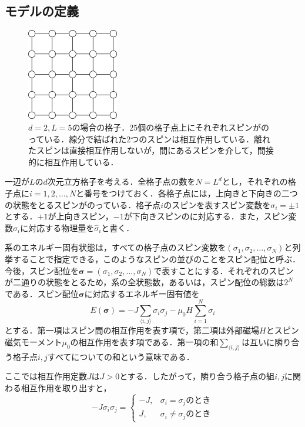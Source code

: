 \documentclass[a4paper,11pt]{jsreport}
\begin{document}
\subsection{モデルの定義}
\begin{figure}[H]
  \begin{center}
      \includegraphics[height=4cm]{image/2次元格子.png}
      \caption{$d=2, L=5$の場合の格子．25個の格子点上にそれぞれスピンがのっている．線分で結ばれた2つのスピンは相互作用している．離れたスピンは直接相互作用しないが，間にあるスピンを介して，間接的に相互作用している．}
  \end{center}
\end{figure}
一辺が$L$の$d$次元立方格子を考える．全格子点の数を$N=L^d$とし，それぞれの格子点に$i=1,2,\dots ,N$と番号をつけておく．各格子点には，上向きと下向きの二つの状態をとるスピンがのっている．格子点$i$のスピンを表すスピン変数を$\sigma_i = \pm{1}$とする．$+1$が上向きスピン，$-1$が下向きスピンのに対応する．また，スピン変数$\sigma_i$に対応する物理量を$\hat{\sigma}_i$と書く．\par
系のエネルギー固有状態は，すべての格子点のスピン変数を$(\sigma_1, \sigma_2, \dots, \sigma_N)$と列挙することで指定できる，このようなスピンの並びのことをスピン配位と呼ぶ．今後，スピン配位を$\bm{\sigma}=(\sigma_1, \sigma_2, \dots, \sigma_N)$で表すことにする．それぞれのスピンが二通りの状態をとるため，系の全状態数，あるいは，スピン配位の総数は$2^N$である．スピン配位$\bm{\sigma}$に対応するエネルギー固有値を
\begin{equation}
  E(\bm{\sigma}) = -J \sum_{\langle i, j \rangle} \sigma_i \sigma_j
  - \mu_0 H \sum_{i=1}^{N} \sigma_i \label{イジングエネルギー}
\end{equation}
とする．第一項はスピン間の相互作用を表す項で，第二項は外部磁場$H$とスピン磁気モーメント$\mu_0$の相互作用を表す項である．第一項の和$\sum_{\langle i, j \rangle}$は互いに隣り合う格子点$i,j$すべてについての和という意味である．\par
ここでは相互作用定数$J$は$J>0$とする．したがって，隣り合う格子点の組$i,j$に関わる相互作用を取り出すと，
\begin{equation}
  -J \sigma_i \sigma_j =
  \begin{cases}
    -J, & \sigma_i = \sigma_j \text{のとき}    \\
    J,  & \sigma_i \neq \sigma_j \text{のとき}
  \end{cases} \label{相互作用項場合分け}
\end{equation}
\end{document}
